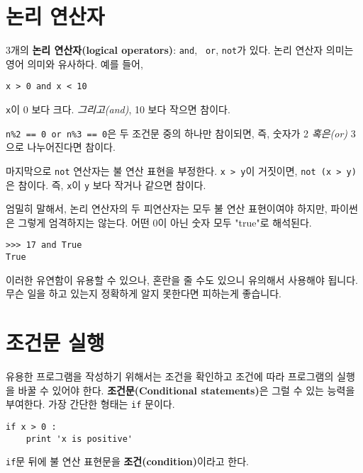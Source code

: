

\section {논리 연산자}



3개의 {\bf 논리 연산자(logical operators)}: {\tt and}, {\tt
or}, {\tt not}가 있다. 논리 연산자 의미는 영어 의미와 유사하다. 예를 들어,

{\tt x > 0 and x < 10} 

{\tt x}이 0 보다 크다. \emph{그리고(and)}, 10 보다 작으면 참이다.



{\tt n\%2 == 0 or n\%3 == 0}은 두 조건문 중의 하나만 참이되면, 즉, 숫자가 2 \emph{혹은(or)} 3으로 나누어진다면 참이다.

마지막으로 {\tt not} 연산자는 불 연산 표현을 부정한다. {\tt x > y}이 거짓이면, {\tt not (x > y)}은 참이다. 즉, {\tt x}이 {\tt y} 보다 작거나 같으면 참이다.

엄밀히 말해서, 논리 연산자의 두 피연산자는 모두 불 연산 표현이여야 하지만, 파이썬은 그렇게 엄격하지는 않는다. 어떤 0이 아닌 숫자 모두 "true"로 해석된다.

\beforeverb
\begin{verbatim}
>>> 17 and True
True
\end{verbatim}
\afterverb
%
이러한 유연함이 유용할 수 있으나, 혼란을 줄 수도 있으니 유의해서 사용해야 됩니다. 무슨 일을 하고 있는지 정확하게 알지 못한다면 피하는게 좋습니다.

\section{조건문 실행}


유용한 프로그램을 작성하기 위해서는 조건을 확인하고 조건에 따라 프로그램의 실행을 바꿀 수 있어야 한다.  
{\bf 조건문(Conditional statements)}은 그럴 수 있는 능력을 부여한다. 가장 간단한 형태는  {\tt if} 문이다.

\beforeverb
\begin{verbatim}
if x > 0 :
    print 'x is positive'
\end{verbatim}
\afterverb
%
{\tt if}문 뒤에 불 연산 표현문을 {\bf 조건(condition)}이라고 한다.

